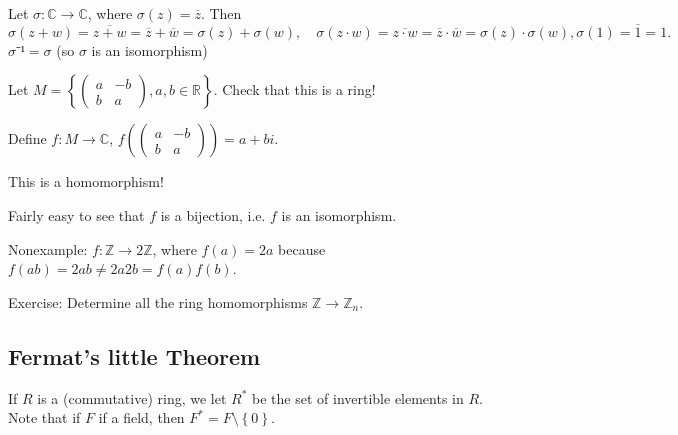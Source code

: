 \documentclass[english]{lbscript}
\begin{document}
\begin{example}{}{}
	Let \(𝜎:ℂ→ℂ\), where \(𝜎(z)=\overline{z}\). Then
	\begin{equation}
		\label{eq:109}
		𝜎(z+w)= \overline{z+w} = \overline{z}+\overline{w}=𝜎(z)+𝜎(w), \quad 𝜎(z⋅w)= \overline{z⋅w} = \overline{z}⋅ \overline{w} = 𝜎(z)⋅𝜎(w), 𝜎\left(1 \right) = \overline{1}= 1.
	\end{equation}
	\(𝜎⁻¹=𝜎\) (so \(𝜎\) is an isomorphism)
\end{example}
\begin{example}{}{}
	Let \(M= \left\{ \begin{pmatrix} a  & -b \\ b  & a \end{pmatrix}, a, b∈ℝ \right\} \). Check that this is a ring!

	Define \(f:M→ℂ\), \(f( \begin{pmatrix} a  & -b \\ b  & a \end{pmatrix}) = a +bi\).

	This is a homomorphism!

	Fairly easy to see that \(f\) is a bijection, i.e. \(f\) is an isomorphism.
\end{example}
\begin{example}{}{}
	Nonexample: \(f:ℤ→2ℤ\), where \(f(a)=2a\) because \(f(ab)=2ab≠2a 2b = f(a)f(b)\).
\end{example}
\begin{example}{}{}
	Exercise: Determine all the ring homomorphisms \(ℤ→ℤ_{n}\).
\end{example}

\subsection{Fermat's little Theorem}
\label{sec:ferm-little-theor}

If \(R\) is a (commutative) ring, we let \(R^{*}\) be the set of invertible elements in \(R\). Note that if \(F\) if a field, then \(F^{*}=F\setminus\left\{ 0 \right\} \).
\end{document}
